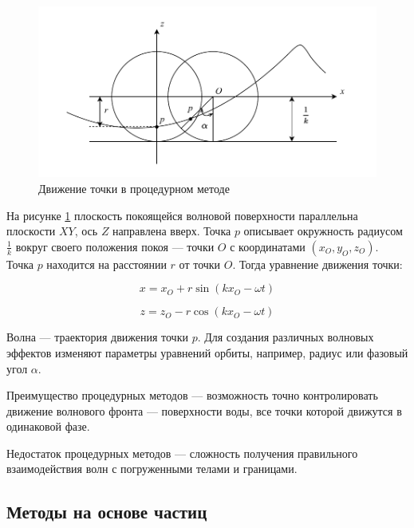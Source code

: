 \begin{figure}[H]
	\begin{center}
		\includegraphics[scale=0.8]{img/procedure.pdf}
	\end{center}
	\captionsetup{justification=centering}
	\caption{Движение точки в процедурном методе}
	\label{img:procedure}
\end{figure}

На рисунке \ref{img:procedure} плоскость покоящейся волновой поверхности параллельна плоскости $XY$, ось $Z$ направлена вверх. Точка $p$ описывает окружность радиусом $\frac{1}{k}$ вокруг своего положения покоя --- точки $O$ с координатами $(x_{O}, y_{O}, z_{O})$. Точка $p$ находится на расстоянии $r$ от точки $O$. Тогда уравнение движения точки:

\begin{equation}
    \label{x}
    x = x_{O} + r\sin (kx_{O} - \omega t)
\end{equation}

\begin{equation}
    \label{z}
    z = z_{O} - r\cos (kx_{O} - \omega t)
\end{equation}

Волна --- траектория движения точки $p$. Для создания различных волновых эффектов изменяют параметры уравнений орбиты, например, радиус или фазовый угол $\alpha$.

Преимущество процедурных методов --- возможность точно контролировать движение волнового фронта --- поверхности воды, все точки которой движутся в одинаковой фазе.

Недостаток процедурных методов --- сложность получения правильного взаимодействия волн с погруженными телами и границами.  

\subsection{Методы на основе частиц}

